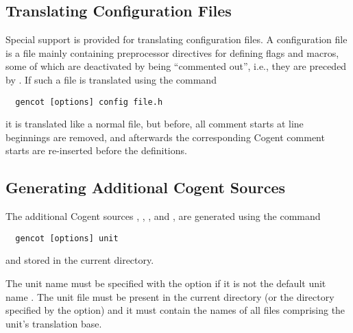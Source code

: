 \subsection{Translating Configuration Files}
\label{app-transauto-config}

Special support is provided for translating configuration files. A configuration file is a  file mainly
containing preprocessor directives for defining flags and macros, some of which are deactivated by being ``commented
out'', i.e., they are preceded by \code{//}. If such a file is translated using the command
\begin{verbatim}
  gencot [options] config file.h
\end{verbatim}
it is translated like a normal  file, but before, all \code{//} comment starts at line beginnings are 
removed, and afterwards the corresponding Cogent comment starts \code{-\relax-} are re-inserted before the definitions.

\subsection{Generating Additional Cogent Sources}
\label{app-transauto-unit}

The additional Cogent sources , , , 
and , are generated using the command
\begin{verbatim}
  gencot [options] unit
\end{verbatim}
and stored in the current directory.

The unit name  must be specified with the  option if it is not the default unit name . The 
unit file  must be present in the current directory (or the directory specified by the  option)
and it must contain the names of all  files comprising the unit's translation base.
